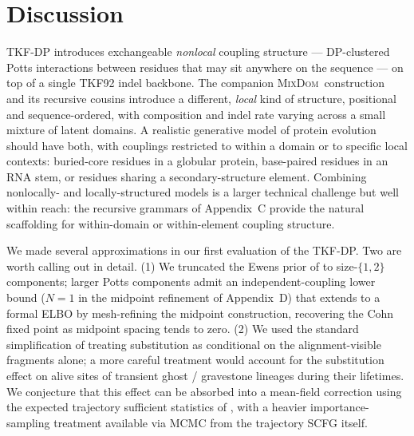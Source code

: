 \documentclass[11pt]{article}
\theoremstyle{definition}
\theoremstyle{remark}
\newcommand{\MixDom}{\textsc{MixDom}}
\begin{document}
\section{Discussion}
\label{sec:discussion}

TKF-DP introduces exchangeable \emph{nonlocal} coupling structure --- DP-clustered Potts
interactions between residues that may sit anywhere on the sequence
--- on top of a single TKF92 indel backbone. The companion
\MixDom\ construction~\citep{LargeHolmes2026} and its recursive cousins introduce a
different, \emph{local} kind of structure, positional and sequence-ordered, with composition and
indel rate varying across a small mixture of
latent domains. A realistic generative model of protein evolution
should have both, with couplings restricted to within a domain
or to specific local contexts: buried-core residues in a
globular protein, base-paired residues in an RNA stem, or residues
sharing a secondary-structure element. Combining nonlocally- and locally-structured models
is a larger technical challenge but well within reach: the recursive
grammars of Appendix~C provide the natural scaffolding for
within-domain or within-element coupling structure.

We made several approximations in our first evaluation of the TKF-DP.
Two are worth calling out in detail.
(1) We truncated the Ewens prior of
 to size-$\{1,2\}$ components; larger
Potts components admit an independent-coupling lower bound
($N{=}1$ in the midpoint refinement of Appendix~D) that extends
to a formal ELBO by mesh-refining the midpoint construction,
recovering the Cohn fixed point as midpoint spacing tends to zero.
(2) We used the standard simplification of treating substitution as conditional on
the alignment-visible fragments alone; a more careful treatment
would account for the substitution effect on alive sites of
transient ghost / gravestone lineages during their lifetimes. We
conjecture that this effect can be absorbed into a mean-field
correction using the expected trajectory sufficient statistics of
, with a heavier importance-sampling treatment
available via MCMC from the trajectory SCFG itself.
\end{document}
